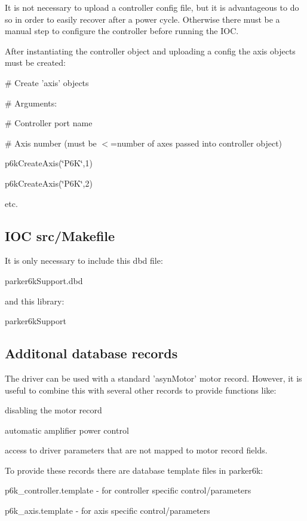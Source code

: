 It is not necessary to upload a controller config file, but it is advantageous to do so in order to easily recover after a power cycle. Otherwise there must be a manual step to configure the controller before running the IOC.

After instantiating the controller object and uploading a config the axis objects must be created:

{\ttfamily  \# Create 'axis' objects\par
 \# Arguments:\par
 \# Controller port name\par
 \# Axis number (must be $<$=number of axes passed into controller object)\par
 p6kCreateAxis(\char`\"{}P6K\char`\"{},1)\par
 p6kCreateAxis(\char`\"{}P6K\char`\"{},2)\par
 etc. }\hypertarget{index_src_makefile}{}\subsection{IOC src/Makefile}\label{index_src_makefile}
It is only necessary to include this dbd file:

{\ttfamily  parker6kSupport.dbd }

and this library:

{\ttfamily  parker6kSupport }\hypertarget{index_records}{}\subsection{Additonal database records}\label{index_records}
The driver can be used with a standard 'asynMotor' motor record. However, it is useful to combine this with several other records to provide functions like:


\begin{DoxyItemize}
\item disabling the motor record 
\item automatic amplifier power control 
\item access to driver parameters that are not mapped to motor record fields. 
\end{DoxyItemize}

To provide these records there are database template files in parker6k:

{\ttfamily p6k\_\-controller.template} -\/ for controller specific control/parameters\par
 {\ttfamily p6k\_\-axis.template} -\/ for axis specific control/parameters\par


